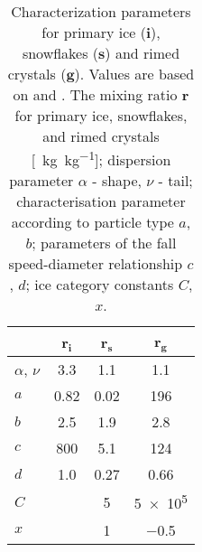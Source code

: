 \begin{table}[!t]
	\begin{center}
		\caption{Characterization parameters for primary ice ($\mathbf{i}$), snowflakes ($\mathbf{s}$) and rimed crystals ($\mathbf{g}$). Values are based on \cite{meteo_france_meso-nh_2009} and \cite{pinty_mixed-phased_1998}. 
			The mixing ratio \textbf{r} for primary ice, snowflakes, and rimed crystals [\SI{}{\kg\per\kg}]; 
			dispersion parameter $\alpha$ - shape, $\nu$ - tail; characterisation parameter according to particle type $a$, $b$; parameters of the fall speed-diameter relationship $c$, $d$; ice category constants $C$, $x$.}\label{tab:ice_parameter}
		\begin{tabular}{l|c|c|c}
			\hline \hline
			& \textbf{r$\mathbf{_i}$}& \textbf{r$\mathbf{_s}$}& \textbf{r$\mathbf{_g}$} \\ \hline\hline
			$\alpha$, $\nu$ & \num{3.3}		& \num{1.1}			& \num{1.1} \\ \hline
			$a$				& \num{0.82}	& \num{0.02}		& \num{196} \\ 
			$b$				& \num{2.5}		& \num{1.9}			& \num{2.8} \\ \hline
			$c$				& \num{800}		& \num{5.1}			& \num{124} \\ 
			$d$				& \num{1.0}		& \num{0.27}		& \num{0.66} \\ \hline
			$C$				&				& \num{5}			& \num{5e5} \\
			$x$				&				& \num{1}			& \num{-0.5} \\
			\hline \hline
		\end{tabular}
	\end{center}
\end{table}